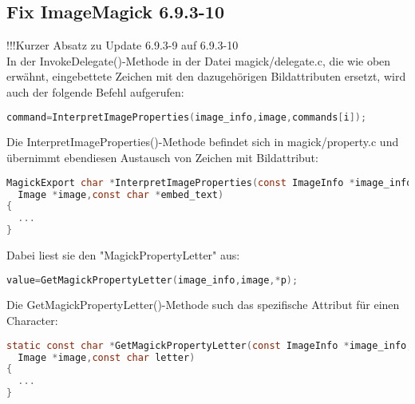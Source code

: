 \subsection{Fix ImageMagick 6.9.3-10}\label{subsec:fix-imagemagick-6.9.3-10}

!!!Kurzer Absatz zu Update 6.9.3-9 auf 6.9.3-10\\

In der InvokeDelegate()-Methode in der Datei magick/delegate.c, die wie oben erwähnt, eingebettete Zeichen mit den dazugehörigen Bildattributen ersetzt, wird auch der folgende Befehl aufgerufen:\\

\begin{lstlisting}[firstnumber=1295, language=C, caption=magick/delegate.c Aufruf InterpretImageProperties(),label={lst:lstlisting}]
command=InterpretImageProperties(image_info,image,commands[i]);
\end{lstlisting}
\vspace{5mm}

Die InterpretImageProperties()-Methode befindet sich in magick/property.c und übernimmt ebendiesen Austausch von Zeichen mit Bildattribut:\\

\begin{lstlisting}[firstnumber=3347, language=C, caption=magick/property.c InterpretImageProperties(),label={lst:lstlisting}]
MagickExport char *InterpretImageProperties(const ImageInfo *image_info,
  Image *image,const char *embed_text)
{
  ...
}
\end{lstlisting}
\vspace{5mm}

Dabei liest sie den "MagickPropertyLetter" aus:\\

\begin{lstlisting}[firstnumber=3466, language=C, caption=magick/property.c Aufruf GetMagickPropertyLetter(),label={lst:lstlisting}]
  value=GetMagickPropertyLetter(image_info,image,*p);
\end{lstlisting}
\vspace{5mm}

Die GetMagickPropertyLetter()-Methode such das spezifische Attribut für einen Character:\\

\begin{lstlisting}[firstnumber=2343, language=C, caption=magick/property.c GetMagickPropertyLetter(),label={lst:lstlisting}]
static const char *GetMagickPropertyLetter(const ImageInfo *image_info,
  Image *image,const char letter)
{
  ...
}
\end{lstlisting}
\vspace{5mm}

